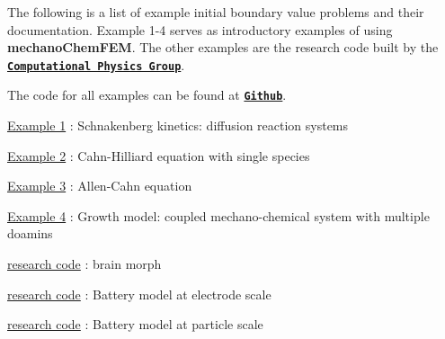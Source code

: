 The following is a list of example initial boundary value problems and their documentation. Example 1-\/4 serves as introductory examples of using {\bfseries mechano\-Chem\-F\-E\-M}. The other examples are the research code built by the \href{http://umich.edu/~compphys/index.html}{\tt {\bfseries Computational Physics Group}}.

The code for all examples can be found at \href{https://github.com/mechanoChem/mechanoChemFEM/tree/example}{\tt {\bfseries Github}}.

\hyperlink{diffusion_reaction}{Example 1} \-: Schnakenberg kinetics\-: diffusion reaction systems \par
 \hyperlink{_cahn_hilliard}{Example 2} \-: Cahn-\/\-Hilliard equation with single species\par
 \hyperlink{_allen__cahn}{Example 3} \-: Allen-\/\-Cahn equation \par
 \hyperlink{growth}{Example 4} \-: Growth model\-: coupled mechano-\/chemical system with multiple doamins\par




\hyperlink{brain_morph}{research code} \-: brain morph \par
 \hyperlink{battery_electrode_scale}{research code} \-: Battery model at electrode scale\par
 \hyperlink{battery_particle}{research code} \-: Battery model at particle scale\par
